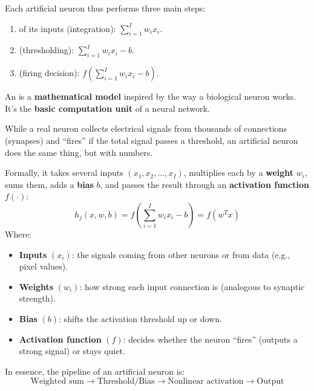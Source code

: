 Each artificial neuron thus performs three main steps:
\begin{enumerate}
    \item {} of its inputs (integration): $\displaystyle\sum_{i=1}^{I} w_{i} x_{i}$.
    \item {} (thresholding): $\displaystyle\sum_{i=1}^{I} w_{i} x_{i} - b$.
    \item {} (firing decision): $f\left(\displaystyle\sum_{i=1}^{I} w_{i} x_{i} - b\right)$.
\end{enumerate}

\newpage

\begin{definitionbox}\label{def:artificial-neuron}
    An  is a \textbf{mathematical model} inspired by the way a biological neuron works. It's the \textbf{basic computation unit} of a neural network.

    \highspace
    While a real neuron collects electrical signals from thousands of connections (synapses) and ``fires'' if the total signal passes a threshold, an artificial neuron does the same thing, but with numbers.

    \highspace
    Formally, it takes several inputs $\left(x_1, x_2, \ldots, x_I\right)$, multiplies each by a \textbf{weight} $w_i$, sums them, adds a \textbf{bias} $b$, and passes the result through an \textbf{activation function} $f(\cdot)$:
    \begin{equation}
        h_{j}\left(x, w, b\right) = f\left(\sum_{i=1}^{I} w_{i} x_{i} - b\right) = f\left(w^{T} x\right)
    \end{equation}
    Where:
    \begin{itemize}
        \item \textbf{Inputs} $\left(x_i\right)$: the signals coming from other neurons or from data (e.g., pixel values).
        \item \textbf{Weights} $\left(w_i\right)$: how strong each input connection is (analogous to synaptic strength).
        \item \textbf{Bias} $\left(b\right)$: shifts the activation threshold up or down.
        \item \textbf{Activation function} $\left(f\right)$: decides whether the neuron ``fires'' (outputs a strong signal) or stays quiet.
    \end{itemize}
    In essence, the pipeline of an artificial neuron is:
    \begin{equation*}
        \text{Weighted sum} \rightarrow \text{Threshold/Bias} \rightarrow \text{Nonlinear activation} \rightarrow \text{Output}
    \end{equation*}
\end{definitionbox}

